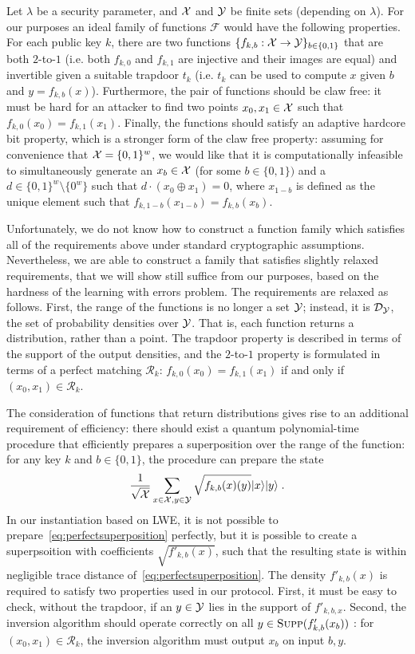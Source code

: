
Let $\lambda$ be a security parameter, and $\mathcal{X}$ and $\mathcal{Y}$ be finite sets (depending on $\lambda$). For our purposes an ideal family of functions $\mathcal{F}$ would have the following properties. For each public key $k$, there are two functions $ \{f_{k,b}:\mathcal{X}\rightarrow \mathcal{Y}\}_{b\in\{0,1\}}$ that are both $2$-to-$1$ (i.e. both $f_{k,0}$ and $f_{k,1}$ are injective and their images are equal) and invertible given a suitable trapdoor $t_k$ (i.e. $t_k$ can be used to compute $x$ given $b$ and $y=f_{k,b}(x)$). Furthermore, the pair of functions should be claw free: it must be hard for an attacker to find two points $x_0,x_1\in\mathcal{X}$ such that $f_{k,0}(x_0) = f_{k,1}(x_1)$. Finally, the functions should satisfy an adaptive hardcore bit property, which is a stronger form of the claw free property: assuming for convenience that $\mathcal{X}= \{0,1\}^w$, we would like that it is computationally infeasible to simultaneously generate an $x_b\in\mathcal{X}$ (for some $b\in\{0,1\})$ and a $d\in \{0,1\}^w\setminus \{0^w\}$ such that $d\cdot (x_0\oplus x_1)=0$, where $x_{1-b}$ is defined as the unique element such that $f_{k,1-b}(x_{1-b})=f_{k,b}(x_b)$. 


Unfortunately, we do not know how to construct a function family which satisfies all of the requirements above under standard cryptographic assumptions. Nevertheless, we are able to construct a family that satisfies slightly relaxed requirements, that we will show still suffice from our purposes, based on the hardness of the learning with errors problem. The requirements are relaxed as follows. First, the range of the functions is no longer a set $\mathcal{Y}$; instead, it is  $\mathcal{D}_{\mathcal{Y}}$, the set of probability densities over $\mathcal{Y}$. That is, each function returns a distribution, rather than a point. The trapdoor property is described in terms of the support of the output densities, and the $2$-to-$1$ property is formulated in terms of a perfect matching $\mathcal{R}_k$: $f_{k,0}(x_0) = f_{k,1}(x_1)$ if and only if $(x_0,x_1)\in\mathcal{R}_k$. 

The consideration of functions that return distributions gives rise to an additional requirement of efficiency: there should exist a quantum polynomial-time procedure that efficiently prepares a superposition over the range of the function: for any key $k$ and $b\in\{0,1\}$, the procedure can prepare the state
\begin{equation}\label{eq:perfectsuperposition}
\frac{1}{\sqrt{\mathcal{X}}}\sum_{x\in \mathcal{X}, y\in \mathcal{Y}}\sqrt{f_{k,b}(x)(y)}|x\rangle|y\rangle\;.
\end{equation}
In our instantiation based on LWE, it is not possible to prepare~\eqref{eq:perfectsuperposition} perfectly, but it is possible to create a superpsoition with coefficients $\sqrt{f'_{k,b}(x)}$, such that the resulting state is within negligible trace distance of~\eqref{eq:perfectsuperposition}. The density $f'_{k,b}(x)$ is required to satisfy two properties used in our protocol. First, it must be easy to check, without the trapdoor, if an $y\in \mathcal{Y}$ lies in the support of $f'_{k,b,x}$. Second, the inversion algorithm should operate correctly on all $y\in\textsc{Supp} (f'_{k,b}(x_b))$ : for $(x_0,x_1)\in\mathcal{R}_k$, the inversion algorithm must output $x_b$ on input $b,y$.

